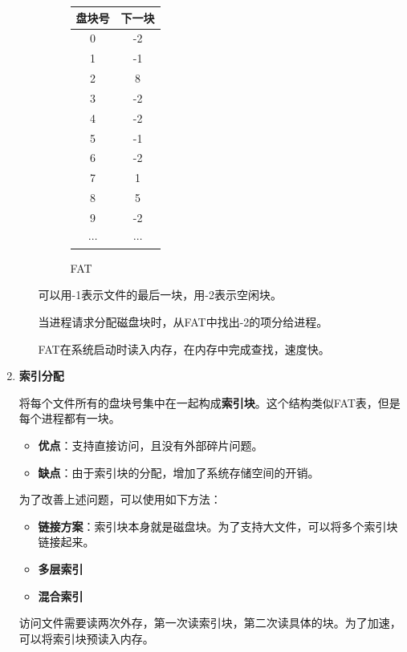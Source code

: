 \documentclass[12pt, a4paper, oneside]{ctexart}
\begin{document}
\begin{enumerate}
\begin{itemize}
    \begin{figure}
      \centering
      \begin{tabular}{|c|c|}
        \hline
        \textbf{盘块号} & \textbf{下一块} \\ \hline
        0 & -2 \\ \hline
        1 & -1 \\ \hline
        2 & 8 \\ \hline
        3 & -2 \\ \hline
        4 & -2 \\ \hline
        5 & -1 \\ \hline
        6 & -2 \\ \hline
        7 & 1 \\ \hline
        8 & 5 \\ \hline
        9 & -2 \\ \hline
        $\cdots$ & $\cdots$ \\ \hline
      \end{tabular}
      \caption{FAT}
    \end{figure}

    可以用-1表示文件的最后一块，用-2表示空闲块。

    当进程请求分配磁盘块时，从FAT中找出-2的项分给进程。

    FAT在系统启动时读入内存，在内存中完成查找，速度快。
  \end{itemize}

  \item {\bf 索引分配} \label{index-allocation}
  
  将每个文件所有的盘块号集中在一起构成\textbf{索引块}。这个结构类似FAT表，但是每个进程都有一块。
  \begin{itemize}
    \item {\bf 优点}：支持直接访问，且没有外部碎片问题。
    \item {\bf 缺点}：由于索引块的分配，增加了系统存储空间的开销。
  \end{itemize}
  为了改善上述问题，可以使用如下方法：
  \begin{itemize}
    \item {\bf 链接方案}：索引块本身就是磁盘块。为了支持大文件，可以将多个索引块链接起来。
    \item {\bf 多层索引}
    \item {\bf 混合索引}
  \end{itemize}

  访问文件需要读两次外存，第一次读索引块，第二次读具体的块。为了加速，可以将索引块预读入内存。


\end{enumerate}
\end{document}
